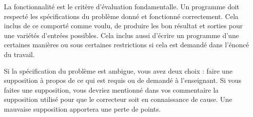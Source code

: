 La fonctionnalité est le critère d'évaluation fondamentalle. Un programme doit respecté les spécifications du problème donné et fonctionné correctement. Cela inclus de ce comporté comme voulu, de produire les bon résultat et sorties pour une variétés d'entrées possibles. Cela inclus aussi d'écrire un programme d'une certaines manières ou sous certaines restrictions si cela est demandé dans l'énoncé du travail.

Si la spécification du problème est ambigue, vous avez deux choix : faire une supposition à propos de ce qui est requis ou de demandé à l'enseignant. Si vous faites une supposition, vous devriez mentionné dans vos commentaire la supposition utilisé pour que le correcteur soit en connaissance de cause. Une mauvaise supposition apportera une perte de points.
